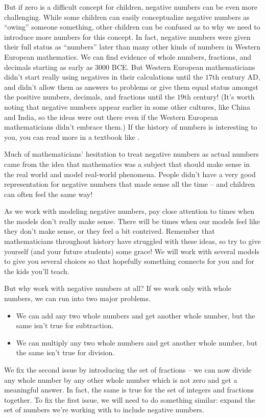 \documentclass{ximera}
\begin{document}
But if zero is a difficult concept for children, negative numbers can be even more challenging. 
While some children can easily conceptualize negative numbers as ``owing'' someone something, 
other children can be confused as to why we need to introduce more numbers for this concept. 
In fact, negative numbers were given their full status as ``numbers'' later than many other kinds 
of numbers in Western European mathematics. We can find evidence of whole numbers, fractions, 
and decimals starting as early as $3000$ BCE. But Western European mathematicians didn't start 
really using negatives in their calculations until the $17$th century AD, and didn't allow them as 
answers to problems or give them equal status amongst the positive numbers, decimals, and 
fractions until the $19$th century! (It's worth noting that negative numbers appear earlier in some 
other cultures, like China and India, so the ideas were out there even if the Western European 
mathematicians didn't embrace them.) If the history of numbers is interesting to you, you can read 
more in a textbook like .

Much of mathematicians' hesitation to treat negative numbers as actual numbers came 
from the idea that mathematics was a subject that should make sense in the real world 
and model real-world phenomena.  People didn't have a very good representation for 
negative numbers that made sense all the time -- and children can often feel the same way!

As we work with modeling negative numbers, pay close attention to times when the models don't really 
make sense. There will be times when our models feel like they don't make sense, or they feel a 
bit contrived. Remember that mathematicians throughout history have struggled with these ideas, so 
try to give yourself (and your future students) some grace! We will work with several models to give you 
several choices so that hopefully something connects for you and for the kids you'll teach. 


But why work with negative numbers at all? If we work only with whole numbers, we can run into two major problems.
\begin{itemize}
	\item We can add any two whole numbers and get another whole number, but the same isn't true for subtraction.
	\item We can multiply any two whole numbers and get another whole number, but the same isn't true for division.
\end{itemize} 
We fix the second issue by introducing the set of fractions -- we can now divide any whole number by any other whole number which is not zero and get a meaningful answer.  In fact, the same is true for the set of integers and fractions together.  To fix the first issue, we will need to do something similar: expand the set of numbers we're working with to include negative numbers.
\end{document}
